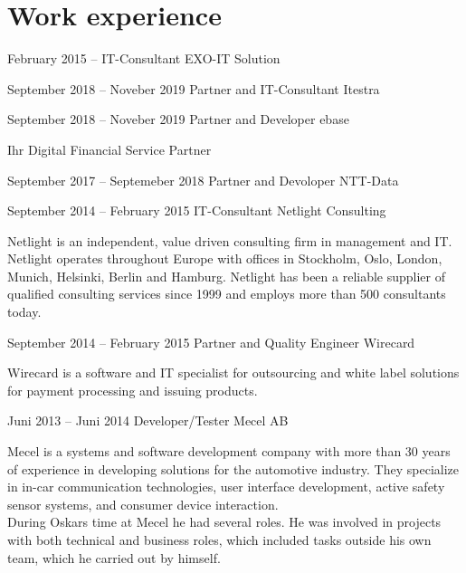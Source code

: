 \documentclass[fontsize=10pt]{tccv}
\begin{document}
\section{Work experience}

\begin{eventlist}

\item{February 2015 -- }
     {IT-Consultant}
     {EXO-IT Solution}

\item{September 2018 -- Noveber 2019}
     {Partner and IT-Consultant}
     {Itestra}

\item{September 2018 -- Noveber 2019}
     {Partner and Developer}
     {ebase}

Ihr Digital Financial Service Partner

\item{September 2017 -- Septemeber 2018}
     {Partner and Devoloper}
     {NTT-Data}

\item{September 2014 -- February 2015}
     {IT-Consultant}
     {Netlight Consulting}

Netlight is an independent, value driven consulting firm in management and IT.
Netlight operates throughout Europe with offices in Stockholm, Oslo, London,
Munich, Helsinki, Berlin and Hamburg. Netlight has been a reliable supplier of
qualified consulting services since 1999 and employs more than 500 consultants
today.


\item{September 2014 -- February 2015}
      {Partner and Quality Engineer}
      {Wirecard}

Wirecard is a software and IT specialist for outsourcing and white label
solutions for payment processing and issuing products.

\newpage

\item{Juni 2013 -- Juni 2014}
     {Developer/Tester}
     {Mecel AB}

Mecel is a systems and software development company with more than 30 years of
experience in developing solutions for the automotive industry. They specialize
in in-car communication technologies, user interface development, active safety
sensor systems, and consumer device interaction.\\

During Oskars time at Mecel he had several roles. He was involved in projects
with both technical and business roles, which included tasks outside his own
team, which he carried out by himself.


\end{eventlist}
\end{document}
